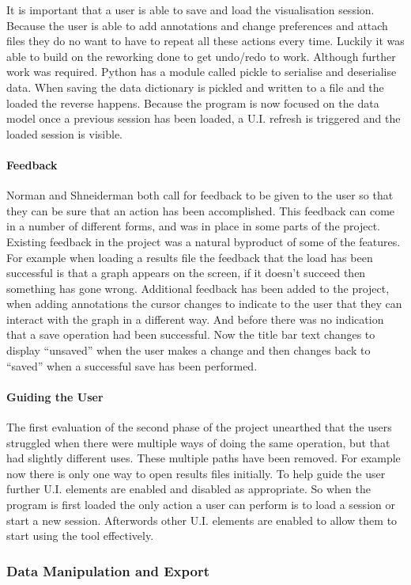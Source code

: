 It is important that a user is able to save and load the visualisation session.  Because the user is able to add annotations and change preferences and attach files they do no want to have to repeat all these actions every time.  Luckily it was able to build on the reworking done to get undo/redo to work.  Although further work was required. Python has a module called pickle to serialise and deserialise data.  When saving the data dictionary is pickled and written to a file and the loaded the reverse happens.  Because the program is now focused on the data model once a previous session has been loaded, a U.I. refresh is triggered and the loaded session is visible.

\paragraph{Feedback}
Norman and Shneiderman both call for feedback to be given to the user so that they can be sure that an action has been accomplished.  This feedback can come in a number of different forms, and was in place in some parts of the project.
Existing feedback in the project was a natural byproduct of some of the features.  For example when loading a results file the feedback that the load has been successful is that a graph appears on the screen, if it doesn't succeed then something has gone wrong.  Additional feedback has been added to the project, when adding annotations the cursor changes to indicate to the user that they can interact with the graph in a different way.  And before there was no indication that a save operation had been successful.  Now the title bar text changes to display ``unsaved'' when the user makes a change and then changes back to ``saved'' when a successful save has been performed.

\paragraph{Guiding the User}

The first evaluation of the second phase of the project unearthed that the users struggled when there were multiple ways of doing the same operation, but that had slightly different uses.  These multiple paths have been removed.  For example now there is only one way to open results files initially.  To help guide the user further U.I. elements are enabled and disabled as appropriate.  So when the program is first loaded the only action a user can perform is to load a session or start a new session.  Afterwords other U.I. elements are enabled to allow them to start using the tool effectively.

\subsubsection{Data Manipulation and Export}
